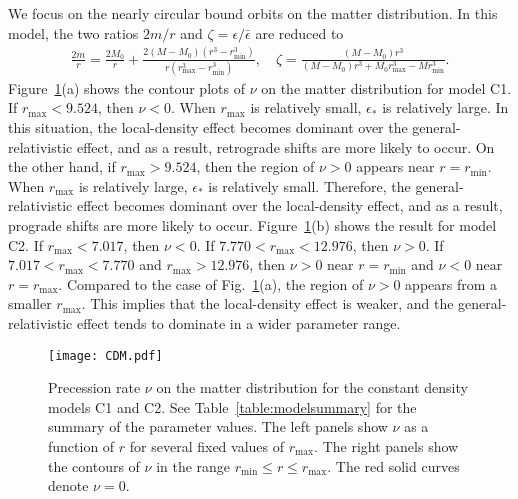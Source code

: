 \documentclass[aps,11pt,nofootinbib,preprintnumbers,groupedaddress,superscriptaddress]{revtex4-2}
\begin{document}
We focus on the nearly circular 
bound orbits on the matter distribution. 
In this model, the two ratios $2m/r$ and $\zeta=\epsilon/\bar{\epsilon}$ are reduced to
\begin{align}
\frac{2m}{r}
=\frac{2M_0}{r}+\frac{2(M-M_0) (r^3-r_{\mathrm{min}}^3)}{r(r_{\mathrm{max}}^3-r_{\mathrm{min}}^3)},
\quad
\zeta
=\frac{(M-M_0) r^3}{(M-M_0)r^3+M_0 r_{\mathrm{max}}^3-M r_{\mathrm{min}}^3}.
\end{align}
Figure~\ref{fig:cdens}(a) shows the contour plots of $\nu$ on the matter distribution for model C1. 
If $r_{\mathrm{max}}<9.524$, then $\nu<0$. 
When $r_{\mathrm{max}}$ is relatively small, $\epsilon_*$ is relatively large. 
In this situation, the local-density effect becomes 
dominant over the 
general-relativistic effect, and as a result, retrograde shifts are more likely to occur.
On the other hand, if $r_{\mathrm{max}}> 9.524$, then 
the region of $\nu> 0$ appears near $r=r_{\mathrm{min}}$. 
When $r_{\mathrm{max}}$ is relatively large, $\epsilon_*$ is relatively small. 
Therefore, the general-relativistic effect becomes 
dominant over the local-density
effect, and as a result, prograde shifts are more likely to occur.
Figure~\ref{fig:cdens}(b) 
shows the result for model C2. 
If $r_{\mathrm{max}}<7.017$, then $\nu<0$. 
If $7.770< r_{\mathrm{max}}< 12.976$, then $\nu> 0$. 
If $7.017< r_{\mathrm{max}}<7.770$ and $r_{\mathrm{max}}> 12.976$, 
then $\nu> 0$ near $r=r_{\mathrm{min}}$ and $\nu<0$ near $r=r_{\mathrm{max}}$.
Compared to the case of Fig.~\ref{fig:cdens}(a), the region of $\nu>0$ appears from a smaller $r_{\mathrm{max}}$. 
This implies that the local-density effect is weaker,
and the general-relativistic effect tends to dominate in a wider parameter range. 
\begin{figure}[t]
\centering
\texttt{[image: CDM.pdf]}
\caption{
Precession rate $\nu$ on the matter distribution for the constant density models C1 and C2. 
See Table~\ref{table:modelsummary} for the summary of the parameter values.
The left panels show $\nu$ as a function of $r$ for several fixed values of $r_{\mathrm{max}}$.
The right panels show the contours of $\nu$ in the range $r_{\mathrm{min}}\le r\le r_{\mathrm{max}}$. 
The red solid curves denote $\nu=0$. 
}
\label{fig:cdens}
\end{figure}
\end{document}

